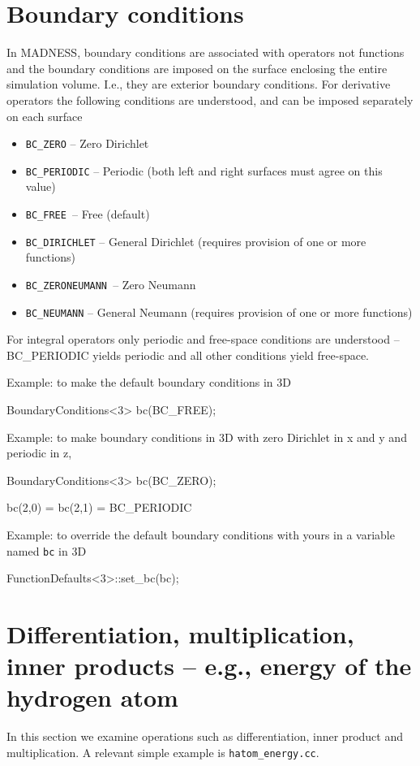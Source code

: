 \documentclass[letterpaper]{article}
\newcommand\liststyleLv{%
\renewcommand\labelitemi{{\textbullet}}
\renewcommand\labelitemii{${\circ}$}
\renewcommand\labelitemiii{${\blacksquare}$}
\renewcommand\labelitemiv{{\textbullet}}
}
\begin{document}
\section{Boundary conditions}
In MADNESS, boundary conditions are associated with operators not functions and the boundary conditions are imposed on
the surface enclosing the entire simulation volume. I.e., they are exterior boundary conditions. For derivative
operators the following conditions are understood, and can be imposed separately on each surface

\liststyleLv
\begin{itemize}
\item \texttt{BC\_ZERO} -- Zero Dirichlet
\item \texttt{BC\_PERIODIC} -- Periodic (both left and right surfaces must agree on this value)
\item \texttt{BC\_FREE }{}-- Free (default)
\item \texttt{BC\_DIRICHLET} -- General Dirichlet (requires provision of one or more functions)
\item \texttt{BC\_ZERONEUMANN }{}-- Zero Neumann
\item \texttt{BC\_NEUMANN} -- General Neumann (requires provision of one or more functions)
\end{itemize}
For integral operators only periodic and free-space conditions are understood -- BC\_PERIODIC yields periodic and all
other conditions yield free-space.

Example: to make the default boundary conditions in 3D

{\ttfamily
BoundaryConditions{\textless}3{\textgreater} bc(BC\_FREE);}

Example: to make boundary conditions in 3D with zero Dirichlet in x and y and periodic in z,

{\ttfamily
BoundaryConditions{\textless}3{\textgreater} bc(BC\_ZERO);}

{\ttfamily
bc(2,0) = bc(2,1) = BC\_PERIODIC}

Example: to override the default boundary conditions with yours in a variable named \texttt{bc} in 3D

{\ttfamily
FunctionDefaults{\textless}3{\textgreater}::set\_bc(bc);}

\section{Differentiation, multiplication, inner products -- e.g., energy of the hydrogen atom}
In this section we examine operations such as differentiation, inner product and multiplication. A relevant simple
example is \texttt{hatom\_energy.cc}.
\end{document}
